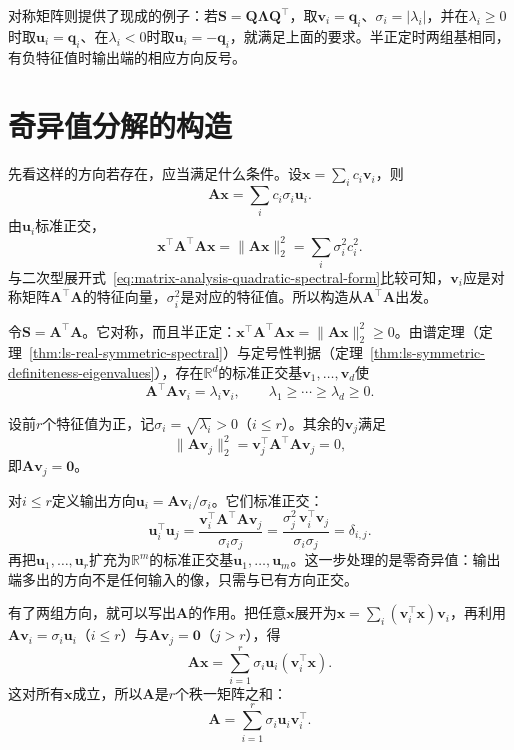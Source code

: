 对称矩阵则提供了现成的例子：若$\bm S=\bm Q\bm\Lambda\bm Q^\top$，取$\bm v_i=\bm q_i$、$\sigma_i=|\lambda_i|$，并在$\lambda_i\geq0$时取$\bm u_i=\bm q_i$、在$\lambda_i<0$时取$\bm u_i=-\bm q_i$，就满足上面的要求。半正定时两组基相同，有负特征值时输出端的相应方向反号。

\section{奇异值分解的构造}
\label{sec:ls-svd-construction}

先看这样的方向若存在，应当满足什么条件。设$\bm x=\sum_ic_i\bm v_i$，则
\[
 \bm A\bm x=\sum_ic_i\sigma_i\bm u_i .
\]
由$\bm u_i$标准正交，
\[
 \bm x^\top\bm A^\top\bm A\bm x=\lVert\bm A\bm x\rVert_2^2=\sum_i\sigma_i^2c_i^2 .
\]
与二次型展开式~\eqref{eq:matrix-analysis-quadratic-spectral-form}比较可知，$\bm v_i$应是对称矩阵$\bm A^\top\bm A$的特征向量，$\sigma_i^2$是对应的特征值。所以构造从$\bm A^\top\bm A$出发。

令$\bm S=\bm A^\top\bm A$。它对称，而且半正定：$\bm x^\top\bm A^\top\bm A\bm x=\lVert\bm A\bm x\rVert_2^2\geq0$。由谱定理（定理~\ref{thm:ls-real-symmetric-spectral}）与定号性判据（定理~\ref{thm:ls-symmetric-definiteness-eigenvalues}），存在$\mathbb R^d$的标准正交基$\bm v_1,\ldots,\bm v_d$使
\[
 \bm A^\top\bm A\bm v_i=\lambda_i\bm v_i,\qquad\lambda_1\geq\cdots\geq\lambda_d\geq0 .
\]

设前$r$个特征值为正，记$\sigma_i=\sqrt{\lambda_i}>0$（$i\leq r$）。其余的$\bm v_j$满足
\[
 \lVert\bm A\bm v_j\rVert_2^2=\bm v_j^\top\bm A^\top\bm A\bm v_j=0 ,
\]
即$\bm A\bm v_j=\bm0$。

对$i\leq r$定义输出方向$\bm u_i=\bm A\bm v_i/\sigma_i$。它们标准正交：
\[
 \bm u_i^\top\bm u_j
 =\frac{\bm v_i^\top\bm A^\top\bm A\bm v_j}{\sigma_i\sigma_j}
 =\frac{\sigma_j^2\,\bm v_i^\top\bm v_j}{\sigma_i\sigma_j}=\delta_{i,j}.
\]
再把$\bm u_1,\dots,\bm u_r$扩充为$\mathbb R^m$的标准正交基$\bm u_1,\ldots,\bm u_m$。这一步处理的是零奇异值：输出端多出的方向不是任何输入的像，只需与已有方向正交。

有了两组方向，就可以写出$\bm A$的作用。把任意$\bm x$展开为$\bm x=\sum_i(\bm v_i^\top\bm x)\bm v_i$，再利用$\bm A\bm v_i=\sigma_i\bm u_i$（$i\leq r$）与$\bm A\bm v_j=\bm0$（$j>r$），得
\[
 \bm A\bm x=\sum_{i=1}^r\sigma_i\bm u_i(\bm v_i^\top\bm x).
\]
这对所有$\bm x$成立，所以$\bm A$是$r$个秩一矩阵之和：
\begin{equation}
 \bm A=\sum_{i=1}^r\sigma_i\bm u_i\bm v_i^\top.
 \label{eq:matrix-analysis-svd-rank-one-sum}
\end{equation}

